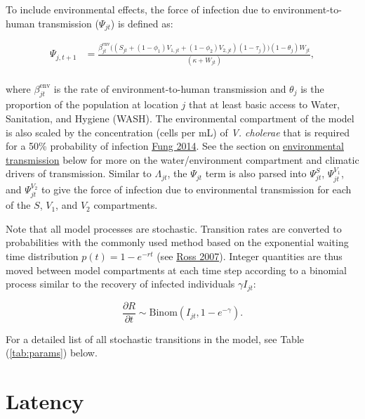 \documentclass[
]{book}
\begin{document}
To include environmental effects, the force of infection due to environment-to-human transmission (\(\Psi_{jt}\)) is defined as:

\begin{equation}
\begin{aligned}
\Psi_{j,t+1} &= \frac{\beta_{jt}^{\text{env}} \big( (S_{jt} + (1-\phi_1) V_{1,jt} + (1-\phi_2) V_{2,jt}) (1-\tau_{j})\big) (1-\theta_j) W_{jt}}{(\kappa+W_{jt})},\\[11pt]
\end{aligned}
\label{eq:foi-environment}
\end{equation}

where \(\beta_{jt}^{\text{env}}\) is the rate of environment-to-human transmission and \(\theta_j\) is the proportion of the population at location \(j\) that at least basic access to Water, Sanitation, and Hygiene (WASH). The environmental compartment of the model is also scaled by the concentration (cells per mL) of \emph{V. cholerae} that is required for a 50\% probability of infection \href{https://www.ncbi.nlm.nih.gov/pmc/articles/PMC3926264/}{Fung 2014}. See the section on \hyperref[environmental-transmission]{environmental transmission} below for more on the water/environment compartment and climatic drivers of transmission. Similar to \(\Lambda_{jt}\), the \(\Psi_{jt}\) term is also parsed into \(\Psi^{S}_{jt}\), \(\Psi^{V_1}_{jt}\), and \(\Psi^{V_2}_{jt}\) to give the force of infection due to environmental transmission for each of the \(S\), \(V_1\), and \(V_2\) compartments.

Note that all model processes are stochastic. Transition rates are converted to probabilities with the commonly used method based on the exponential waiting time distribution \(p(t) = 1-e^{-rt}\) (see \href{https://www.google.com/books/edition/Introduction_to_Probability_Models/1uxBwhAb_zYC?hl=en}{Ross 2007}). Integer quantities are thus moved between model compartments at each time step according to a binomial process similar to the recovery of infected individuals \(\gamma I_{jt}\):

\begin{equation}
\frac{\partial R}{\partial t} \sim \text{Binom}(I_{jt}, 1-e^{-\gamma}).
\end{equation}

For a detailed list of all stochastic transitions in the model, see Table (\ref{tab:params}) below.

\section{Latency}\label{latency}
\end{document}
